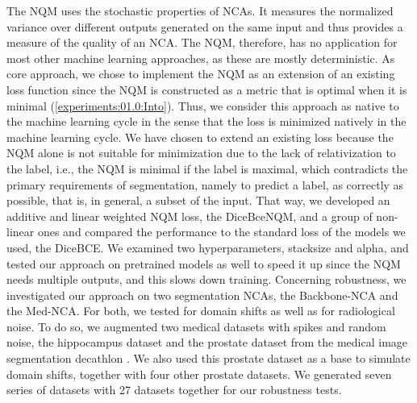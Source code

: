 The NQM uses the stochastic properties of NCAs. It measures the normalized variance over different outputs generated on the same input and thus provides a measure of the quality of an NCA. The NQM, therefore, has no application for most other machine learning approaches, as these are mostly deterministic.
As core approach, we chose to implement the NQM as an extension of an existing loss function since the NQM is constructed as a metric that is optimal when it is minimal (\autoref{experiments:01.0:Into}). Thus, we consider this approach as native to the machine learning cycle in the sense that the loss is minimized natively in the machine learning cycle. 
We have chosen to extend an existing loss because the NQM alone is not suitable for minimization due to the lack of relativization to the label, i.e., the NQM is minimal if the label is maximal, which contradicts the primary requirements of segmentation, namely to predict a label, as correctly as possible, that is, in general, a subset of the input.
That way, we developed an additive and linear weighted NQM loss, the DiceBceNQM, and a group of non-linear ones and compared the performance to the standard loss of the models we used, the DiceBCE. We examined two hyperparameters, stacksize and alpha, and tested our approach on pretrained models as well to speed it up since the NQM needs multiple outputs, and this slows down training.
Concerning robustness, we investigated our approach on two segmentation NCAs, the Backbone-NCA and the Med-NCA. For both, we tested for domain shifts as well as for radiological noise. To do so, we augmented two medical datasets with spikes and random noise, the hippocampus dataset and the prostate dataset from the medical image segmentation decathlon \cite{Antonelli:2022:MedSegmentationDecatlon}. We also used this prostate dataset as a base to simulate domain shifts, together with four other prostate datasets. We generated seven series of datasets with 27 datasets together for our robustness tests.

